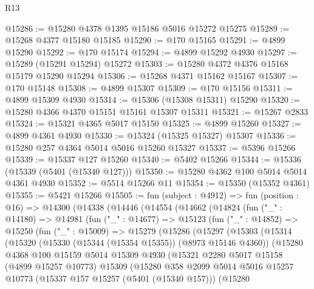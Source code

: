\begin{lexlean}{R13}
\begin{coremodule}
@15286 := @15280 @4378 @1395 @15186 @5016 @15272 @15275
@15289 := @15268 @4377 @15180 @15185
@15290 := @170 @15165
@15291 := @4899 @15290
@15292 := @170 @15174
@15294 := @4899 @15292 @4930
@15297 := @15289 (@15291 @15294) @15272
@15303 := @15280 @4372 @4376 @15168 @15179 @15290 @15294
@15306 := @15268 @4371 @15162 @15167
@15307 := @170 @15148
@15308 := @4899 @15307
@15309 := @170 @15156
@15311 := @4899 @15309 @4930
@15314 := @15306 (@15308 @15311) @15290
@15320 := @15280 @4366 @4370 @15151 @15161 @15307 @15311
@15321 := @15267 @2833
@15324 := @15321 @4365 @5017 @15150
@15325 := @4899 @15260
@15327 := @4899 @4361 @4930
@15330 := @15324 (@15325 @15327) @15307
@15336 := @15280 @257 @4364 @5014 @5016 @15260 @15327
@15337 := @5396 @15266
@15339 := @15337 @127 @15260
@15340 := @5402 @15266
@15344 := @15336 (@15339 (@5401 (@15340 @127)))
@15350 := @15280 @4362 @100 @5014 @5014 @4361 @4930
@15352 := @5514 @15266 @11
@15354 := @15350 (@15352 @4361)
@15355 := @5421 @15266
@15505 := fun (subject : @4912) =>
  fun (position : @16) =>
  @14300
    (@14338
      (@14446
        (@14554
          (@14662
            (@14824
              (fun ("_" : @14180) =>
              @14981
                (fun ("_" : @14677) =>
                @15123
                  (fun ("_" : @14852) =>
                  @15250
                    (fun ("_" : @15009) =>
                    @15279
                      (@15286
                        (@15297
                          (@15303
                            (@15314
                              (@15320
                                (@15330 (@15344 (@15354 @15355)) (@8973 @15146 @4360))
                                (@15280
                                  @4368
                                  @100
                                  @15159
                                  @5014
                                  @15309
                                  @4930
                                  (@15321
                                    @2280
                                    @5017
                                    @15158
                                    (@4899 @15257 @10773)
                                    @15309
                                    (@15280
                                      @358
                                      @2099
                                      @5014
                                      @5016
                                      @15257
                                      @10773
                                      (@15337 @157 @15257 (@5401 (@15340 @157)))
                                      (@15280

\end{coremodule}
\end{lexlean}
